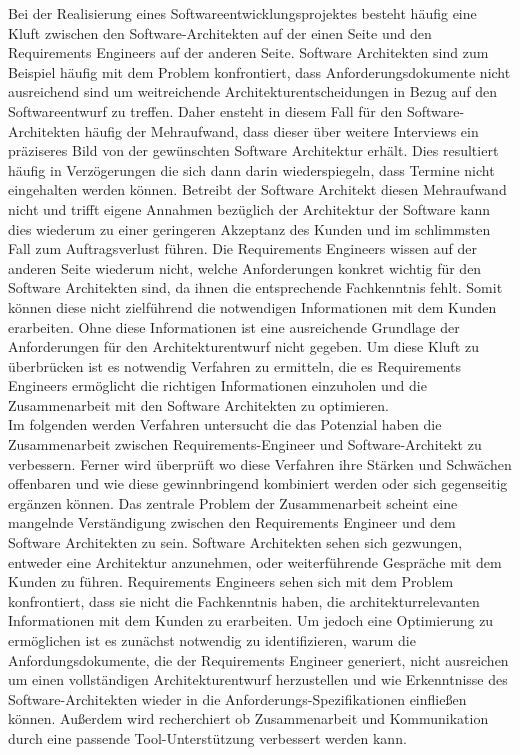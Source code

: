  Bei der Realisierung eines Softwareentwicklungsprojektes besteht häufig eine Kluft zwischen den Software-Architekten auf der einen Seite und den Requirements Engineers auf der anderen Seite. Software Architekten sind zum Beispiel häufig mit dem Problem konfrontiert, dass Anforderungsdokumente nicht ausreichend sind um weitreichende Architekturentscheidungen in Bezug auf den Softwareentwurf zu treffen. Daher ensteht in diesem Fall für den Software-Architekten häufig der Mehraufwand, dass dieser über weitere Interviews ein präziseres Bild von der gewünschten Software Architektur erhält. Dies resultiert häufig in Verzögerungen die sich dann darin wiederspiegeln, dass Termine nicht eingehalten werden können. Betreibt der Software Architekt diesen Mehraufwand nicht und trifft eigene Annahmen bezüglich der Architektur der Software kann dies wiederum zu einer geringeren Akzeptanz des Kunden und im schlimmsten Fall zum Auftragsverlust führen. Die Requirements Engineers wissen auf der anderen Seite wiederum nicht, welche Anforderungen konkret wichtig für den Software Architekten sind, da ihnen die entsprechende Fachkenntnis fehlt. Somit können diese nicht zielführend die notwendigen Informationen mit dem Kunden erarbeiten. Ohne diese Informationen ist eine ausreichende Grundlage der Anforderungen für den Architekturentwurf nicht gegeben. Um diese Kluft zu überbrücken ist es notwendig Verfahren zu ermitteln, die es Requirements Engineers ermöglicht die richtigen Informationen einzuholen und die Zusammenarbeit mit den Software Architekten zu optimieren.\\

Im folgenden werden Verfahren untersucht die das Potenzial haben die Zusammenarbeit zwischen Requirements-Engineer und Software-Architekt zu verbessern. Ferner wird überprüft wo diese Verfahren ihre Stärken und Schwächen offenbaren und wie diese gewinnbringend kombiniert werden oder sich gegenseitig ergänzen können. Das zentrale Problem der Zusammenarbeit scheint eine mangelnde Verständigung zwischen den Requirements Engineer und dem Software Architekten zu sein. Software Architekten sehen sich gezwungen, entweder eine Architektur anzunehmen, oder weiterführende Gespräche mit dem Kunden zu führen. Requirements Engineers sehen sich mit dem Problem konfrontiert, dass sie nicht die Fachkenntnis haben, die architekturrelevanten Informationen mit dem Kunden zu erarbeiten. Um jedoch eine Optimierung zu ermöglichen ist es zunächst notwendig zu identifizieren, warum die Anfordungsdokumente, die der Requirements Engineer generiert, nicht ausreichen um einen vollständigen Architekturentwurf herzustellen und wie Erkenntnisse des Software-Architekten wieder in die Anforderungs-Spezifikationen einfließen können. Außerdem wird recherchiert ob Zusammenarbeit und Kommunikation durch eine passende Tool-Unterstützung verbessert werden kann.\\

